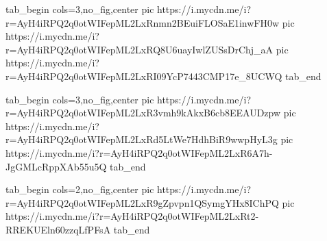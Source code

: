 \ifcmt
  tab_begin cols=3,no_fig,center
     pic https://i.mycdn.me/i?r=AyH4iRPQ2q0otWIFepML2LxRnmn2BEuiFLOSaE1inwFH0w
		 pic https://i.mycdn.me/i?r=AyH4iRPQ2q0otWIFepML2LxRQ8U6uayIwlZUSsDrChj_aA
		 pic https://i.mycdn.me/i?r=AyH4iRPQ2q0otWIFepML2LxRI09YcP7443CMP17e_8UCWQ
  tab_end
\fi


\ifcmt
  tab_begin cols=3,no_fig,center
     pic https://i.mycdn.me/i?r=AyH4iRPQ2q0otWIFepML2LxR3vmh9kAkxB6cb8EEAUDzpw
		 pic https://i.mycdn.me/i?r=AyH4iRPQ2q0otWIFepML2LxRd5LtWe7HdhBiR9wwpHyL3g
		 pic https://i.mycdn.me/i?r=AyH4iRPQ2q0otWIFepML2LxR6A7h-JgGMLcRppXAb55u5Q
  tab_end
\fi

\ifcmt
  tab_begin cols=2,no_fig,center
		pic https://i.mycdn.me/i?r=AyH4iRPQ2q0otWIFepML2LxR9gZpvpn1QSymgYHx8IChPQ
		pic https://i.mycdn.me/i?r=AyH4iRPQ2q0otWIFepML2LxRt2-RREKUEln60zzqLfPFsA
  tab_end
\fi

